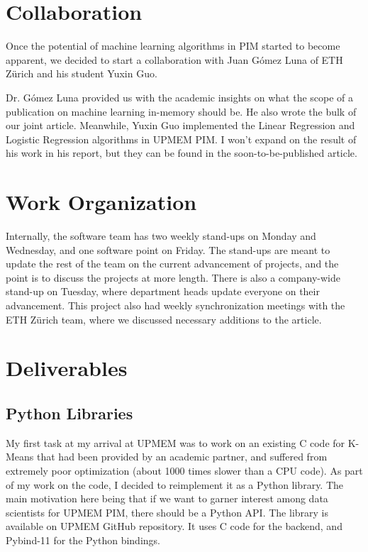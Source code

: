 \section{Collaboration}

Once the potential of machine learning algorithms in PIM started to become apparent, we decided to start a collaboration with Juan Gómez Luna of ETH Zürich and his student Yuxin Guo.

Dr. Gómez Luna provided us with the academic insights on what the scope of a publication on machine learning in-memory should be. He also wrote the bulk of our joint article. Meanwhile, Yuxin Guo implemented the Linear Regression and Logistic Regression algorithms in UPMEM PIM. I won't expand on the result of his work in his report, but they can be found in the soon-to-be-published article.

\section{Work Organization}

Internally, the software team has two weekly stand-ups on Monday and Wednesday, and one software point on Friday. The stand-ups are meant to update the rest of the team on the current advancement of projects, and the point is to discuss the projects at more length.
There is also a company-wide stand-up on Tuesday, where department heads update everyone on their advancement.
This project also had weekly synchronization meetings with the ETH Zürich team, where we discussed necessary additions to the article.

\section{Deliverables}

\subsection{Python Libraries}

My first task at my arrival at UPMEM was to work on an existing C code for K-Means that had been provided by an academic partner, and suffered from extremely poor optimization (about 1000 times slower than a CPU code). As part of my work on the code, I decided to reimplement it as a Python library. The main motivation here being that if we want to garner interest among data scientists for UPMEM PIM, there should be a Python API. The library is available on UPMEM GitHub repository. It uses C code for the backend, and Pybind-11 for the Python bindings.

